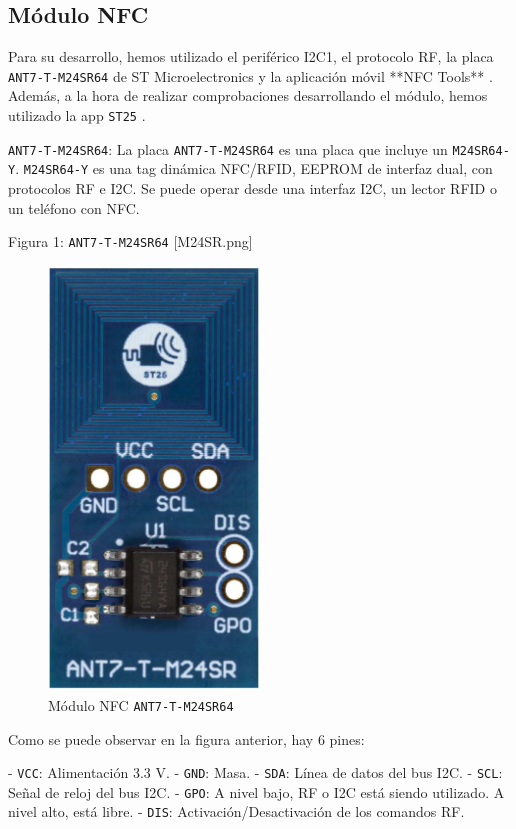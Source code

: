 \subsection{Módulo NFC}

Para su desarrollo, hemos utilizado el periférico I2C1, el protocolo RF, la placa \texttt{ANT7-T-M24SR64} \cite{M24SR64YPagWeb} de ST Microelectronics y la aplicación móvil **NFC Tools** \cite{NFCTools}. Además, a la hora de realizar comprobaciones desarrollando el módulo, hemos utilizado la app \texttt{ST25} \cite{ST25}.

\texttt{ANT7-T-M24SR64}: 
La placa \texttt{ANT7-T-M24SR64} es una placa que incluye un \texttt{M24SR64-Y}. \texttt{M24SR64-Y} es una tag dinámica NFC/RFID, EEPROM de interfaz dual, con protocolos RF e I2C. Se puede operar desde una interfaz I2C, un lector RFID o un teléfono con NFC.

Figura 1: \texttt{ANT7-T-M24SR64} [M24SR.png]
\begin{figure}[h]
    \centerin
    \includegraphics[width=0.5\textwidth]{images/2/2-5/M24SR.png}
    \caption{Módulo NFC \texttt{ANT7-T-M24SR64}}
    \label{fig:2-5-modulo-nfc}
\end{figure}

Como se puede observar en la figura anterior, hay 6 pines:

- \texttt{VCC}: Alimentación 3.3 V.
- \texttt{GND}: Masa.
- \texttt{SDA}: Línea de datos del bus I2C.
- \texttt{SCL}: Señal de reloj del bus I2C.
- \texttt{GPO}: A nivel bajo, RF o I2C está siendo utilizado. A nivel alto, está libre.
- \texttt{DIS}: Activación/Desactivación de los comandos RF.
